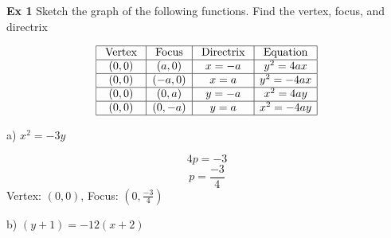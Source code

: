 \documentclass{report}
\begin{document}
\bigbreak \noindent \bigbreak \noindent
\begin{large}
	\textbf{Ex 1}
	Sketch the graph of the following functions. Find the vertex, focus, and directrix
\end{large}
\bigbreak \noindent

$$
\begin{array}{|c|c|c|c|}
\hline \text { Vertex } & \text { Focus } & \text { Directrix } & \text { Equation } \\
\hline(0,0) & (a, 0) & x=-a & y^2=4 a x \\
\hline(0,0) & (-a, 0) & x=a & y^2=-4 a x \\
\hline(0,0) & (0, a) & y=-a & x^2=4 a y \\
\hline(0,0) & (0,-a) & y=a & x^2=-4 a y \\
\hline
\end{array}
$$
\bigbreak \noindent \bigbreak \noindent

\begin{large}
\noindent a) $x^2 = -3y$ 
\end{large}
\vspace{3mm}

$$4p = -3$$
$$p = \frac{-3}{4}$$
Vertex: $(0,0)$, 
\vspace{2mm}
\noindent Focus: $(0, \frac{-3}{4})$
\begin{center}
		\begin{center}
		\end{center}
\end{center}
\bigbreak \noindent \bigbreak \noindent
\begin{large}
	b) $\left(y+1\right) = -12\left(x+2\right)$ 

\end{large}
\end{document}
